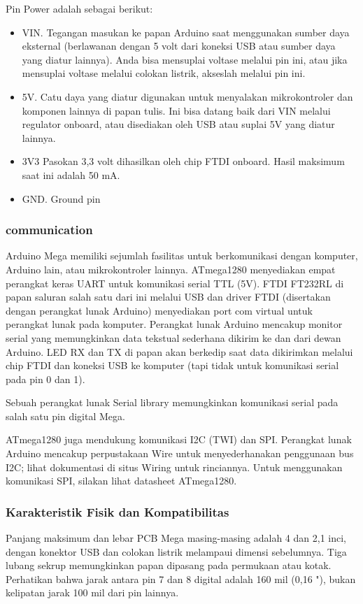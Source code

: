 Pin Power adalah sebagai berikut:
\begin{itemize}
\item VIN. Tegangan masukan ke papan Arduino saat menggunakan sumber daya eksternal (berlawanan dengan 5 volt dari koneksi USB atau sumber daya yang diatur lainnya). Anda bisa mensuplai voltase melalui pin ini, atau jika mensuplai voltase melalui colokan listrik, akseslah melalui pin ini.
\item 5V. Catu daya yang diatur digunakan untuk menyalakan mikrokontroler dan komponen lainnya di papan tulis. Ini bisa datang baik dari VIN melalui regulator onboard, atau disediakan oleh USB atau suplai 5V yang diatur lainnya.
\item 3V3 Pasokan 3,3 volt dihasilkan oleh chip FTDI onboard. Hasil maksimum saat ini adalah 50 mA.
\item GND. Ground pin
\end{itemize}

\subsubsection{communication}
Arduino Mega memiliki sejumlah fasilitas untuk berkomunikasi dengan komputer, Arduino lain, atau mikrokontroler lainnya. ATmega1280 menyediakan empat perangkat keras UART untuk komunikasi serial TTL (5V). FTDI FT232RL di papan saluran salah satu dari ini melalui USB dan driver FTDI (disertakan dengan perangkat lunak Arduino) menyediakan port com virtual untuk perangkat lunak pada komputer. Perangkat lunak Arduino mencakup monitor serial yang memungkinkan data tekstual sederhana dikirim ke dan dari dewan Arduino. LED RX dan TX di papan akan berkedip saat data dikirimkan melalui chip FTDI dan koneksi USB ke komputer (tapi tidak untuk komunikasi serial pada pin 0 dan 1).

Sebuah perangkat lunak Serial library memungkinkan komunikasi serial pada salah satu pin digital Mega.

ATmega1280 juga mendukung komunikasi I2C (TWI) dan SPI. Perangkat lunak Arduino mencakup perpustakaan Wire untuk menyederhanakan penggunaan bus I2C; lihat dokumentasi di situs Wiring untuk rinciannya. Untuk menggunakan komunikasi SPI, silakan lihat datasheet ATmega1280.

\subsubsection{Karakteristik Fisik dan Kompatibilitas}
Panjang maksimum dan lebar PCB Mega masing-masing adalah 4 dan 2,1 inci, dengan konektor USB dan colokan listrik melampaui dimensi sebelumnya. Tiga lubang sekrup memungkinkan papan dipasang pada permukaan atau kotak. Perhatikan bahwa jarak antara pin 7 dan 8 digital adalah 160 mil (0,16 "), bukan kelipatan jarak 100 mil dari pin lainnya.

